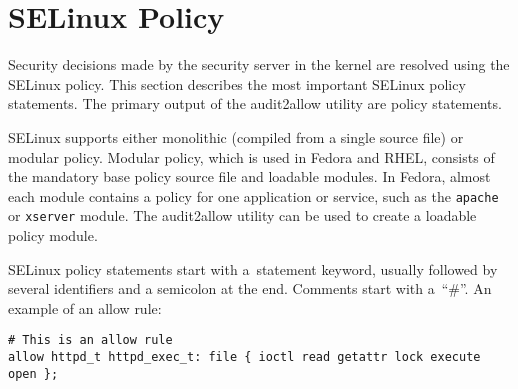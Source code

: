 \section{SELinux Policy}
\label{policy}
Security decisions made by the security server in the kernel are resolved using
the SELinux policy. This section describes the most important SELinux policy
statements. The primary output of the audit2allow utility are policy statements.

SELinux supports either monolithic (compiled from a single source file) or
modular policy. Modular policy, which is used in Fedora and RHEL, consists of
the mandatory base policy source file and loadable modules. In Fedora, almost
each module contains a policy for one application or service, such as the
\texttt{apache} or \texttt{xserver} module. The audit2allow utility can be used
to create a loadable policy module.

SELinux policy statements start with a~statement keyword, usually followed by
several identifiers and a semicolon at the end. Comments start with a~``\#''.
An example of an allow rule:

\begin{lstlisting}[language=te]
# This is an allow rule
allow httpd_t httpd_exec_t: file { ioctl read getattr lock execute open };
\end{lstlisting}

